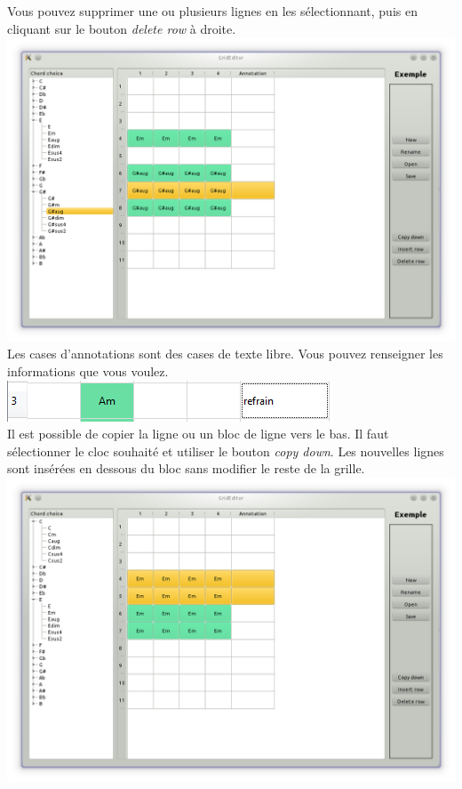 \documentclass[a4paper]{article}
\begin{document}
Vous pouvez supprimer une ou plusieurs lignes en les sélectionnant, puis en cliquant sur le bouton \textit{delete row} à droite.\\
\includegraphics[scale=0.5]{manulutil5.png}\\
Les cases d'annotations sont des cases de texte libre. Vous pouvez renseigner les informations que vous voulez.\\
\includegraphics[scale=0.5]{manulutil6.png}\\
Il est possible de copier la ligne ou un bloc de ligne vers le bas. 
Il faut sélectionner le cloc souhaité et utiliser le bouton \textit{copy down}. 
Les nouvelles lignes sont insérées en dessous du bloc sans modifier le reste de la grille.\\
\includegraphics[scale=0.5]{manulutil7.png}\\
\end{document}
